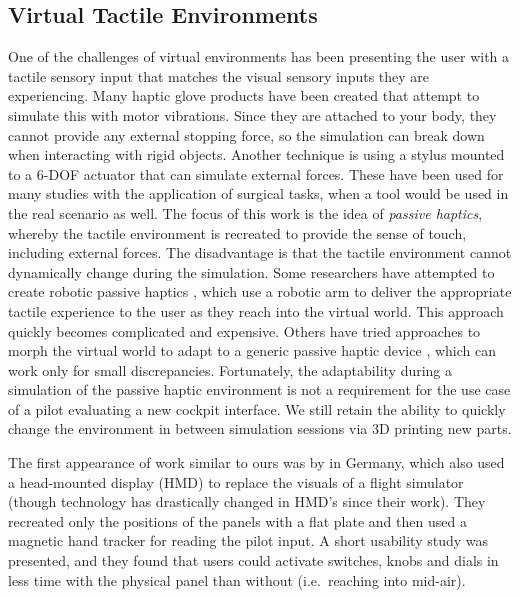 \subsection{Virtual Tactile Environments}
\label{virtual-tactile-environments}

One of the challenges of virtual environments has been presenting the user with a tactile sensory input that matches the visual sensory inputs they are experiencing.
Many haptic glove products have been created that attempt to simulate this with motor vibrations.
Since they are attached to your body, they cannot provide any external stopping force, so the simulation can break down when interacting with rigid objects.
Another technique is using a stylus mounted to a 6-DOF actuator that can simulate external forces.
These have been used for many studies with the application of surgical tasks, when a tool would be used in the real scenario as well.
The focus of this work is the idea of \emph{passive haptics}, whereby the tactile environment is recreated to provide the sense of touch, including external forces.
The disadvantage is that the tactile environment cannot dynamically change during the simulation.
Some researchers have attempted to create robotic passive haptics \citep{mcneely_robotic_1993, tachi_construction_1994}, which use a robotic arm to deliver the appropriate tactile experience to the user as they reach into the virtual world.
This approach quickly becomes complicated and expensive.
Others have tried approaches to morph the virtual world to adapt to a generic passive haptic device \citep{kohli_exploiting_2009,kohli_redirected_2012}, which can work only for small discrepancies.
Fortunately, the adaptability during a simulation of the passive haptic environment is not a requirement for the use case of a pilot evaluating a new cockpit interface.
We still retain the ability to quickly change the environment in between simulation sessions via 3D printing new parts.

The first appearance of work similar to ours was by \citet{schiefele_simple_1998} in Germany, which also used a head-mounted display (HMD) to replace the visuals of a flight simulator (though technology has drastically changed in HMD's since their work).
They recreated only the positions of the panels with a flat plate and then used a magnetic hand tracker for reading the pilot input.
A short usability study was presented, and they found that users could activate switches, knobs and dials in less time with the physical panel than without (i.e.\ reaching into mid-air).


